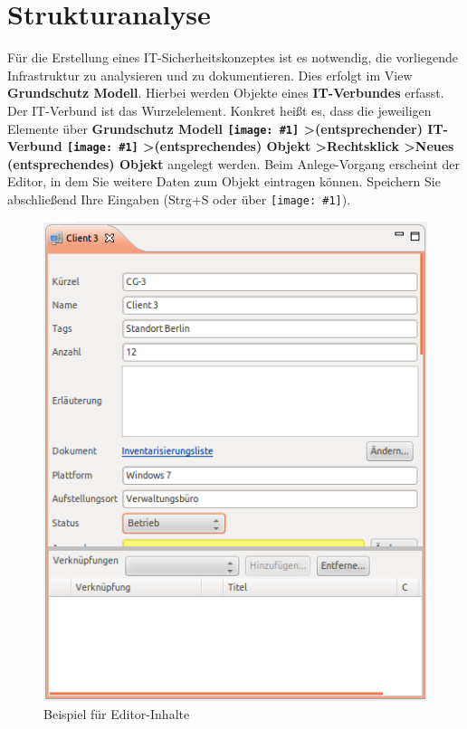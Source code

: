 \documentclass[a4paper,10pt]{book}
\newcommand{\icon}[1]{\texttt{[image: \#1]}}
\begin{document}
\section{Strukturanalyse} \label{Strukturanalyse}
Für die Erstellung eines IT-Sicherheitskonzeptes ist es notwendig, die vorliegende Infrastruktur zu analysieren und zu dokumentieren. Dies erfolgt im View \textbf{Grundschutz Modell}. Hierbei werden Objekte eines \textbf{IT-Verbundes} erfasst. Der IT-Verbund ist das Wurzelelement. Konkret heißt es, dass die jeweiligen Elemente über \textbf{Grundschutz Modell \icon{Icon/GS_Modell.png} \textgreater (entsprechender) IT-Verbund \icon{Icon/GS_Modell.png} \textgreater (entsprechendes) Objekt \textgreater Rechtsklick \textgreater Neues (entsprechendes) Objekt} angelegt werden. Beim Anlege-Vorgang erscheint der Editor, in dem Sie weitere Daten zum Objekt eintragen können. Speichern Sie abschließend Ihre Eingaben (Strg+S oder über \icon{Icon/Disk.png}).
\newline
\begin{figure}[htb!]
  \centering
  \includegraphics[scale=.65]{Screenshot/Editor-View_GS.png}
  \caption{\label{Beispiel fuer Editor-Inhalte} Beispiel für Editor-Inhalte}
\end{figure}
\end{document}
